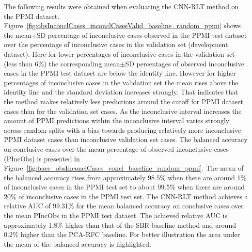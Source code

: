 The following results were obtained when evaluating the CNN-RLT method on the PPMI dataset.
Figure~\ref{fig:obsInconclCases_inconclCasesValid_baseline_random_ppmi} shows the
mean$\pm$SD percentage of inconclusive cases observed in the PPMI test dataset 
over the percentage of inconclusive cases in the validation set (development dataset).
Here for lower percentages of inconclusive cases in the validation set (less than 6\%) the corresponding 
mean$\pm$SD percentages of observed inconclusive cases in the PPMI test dataset are below the identity line.
However for higher percentages of inconclusive cases in the validation set the mean rises above the identity line
and the standard deviation increases strongly.
That indicates that the method makes relatively less predictions around the cutoff for PPMI dataset cases than 
for the validation set cases.
As the inconclusive interval increases the amount of PPMI predictions within the inconclusive interval varies strongly 
across random splits with a bias towards producing relatively more inconclusive PPMI dataset cases 
than inconclusive validation set cases.
The balanced accuracy on conclusive cases over the mean percentage of observed inconclusive cases (PIncObs) is presented 
in Figure~\ref{fig:bacc_obsInconclCases_concl_baseline_random_ppmi}.
The mean of the balanced accuracy rises from approximately 98.5\% 
when there are around 1\% of inconclusive cases in the PPMI test set to about 99.5\% 
when there are around 20\% of inconclusive cases in the PPMI test set.
The CNN-RLT method achieves a relative AUC of 99.31\% for the mean balanced accuracy on conclusive cases 
over the mean PIncObs in the PPMI test dataset.
The achieved relative AUC is approximately 1.8\% higher than that of the SBR baseline method 
and around 0.2\% higher than the PCA-RFC baseline.
For better illustration the area under the mean of the balanced accuracy is highlighted.



